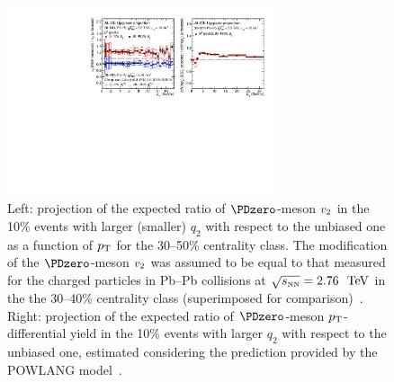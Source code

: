 \begin{figure}[ht]
  \begin{center}
    \includegraphics[width=0.7\textwidth]{hf/figures/D0ESE_3050_upgradeprojection.pdf}
 
    \caption{Left: projection of the expected ratio of $\PDzero$-meson $v_{\rm 2}$ in the 10\% events with larger (smaller) $q_2$ with respect to the unbiased one as a function of $p_{\rm T}$ for the 30--50\% centrality class. The modification of the $\PDzero$-meson $v_{\rm 2}$ was assumed to be equal to that measured for the charged particles in Pb--Pb collisions at $\sqrt{s_{\scriptscriptstyle \rm NN}}=2.76~{~\text{TeV}}$ in the the 30--40\% centrality class (superimposed for comparison)~\cite{XXX}. Right: projection of the expected ratio of $\PDzero$-meson $p_{\rm T}$-differential yield in the 10\% events with larger $q_2$ with respect to the unbiased one, estimated considering the prediction provided by the POWLANG model~\cite{XXX}.}
    \label{fig:ESE}
  \end{center}
\end{figure}




